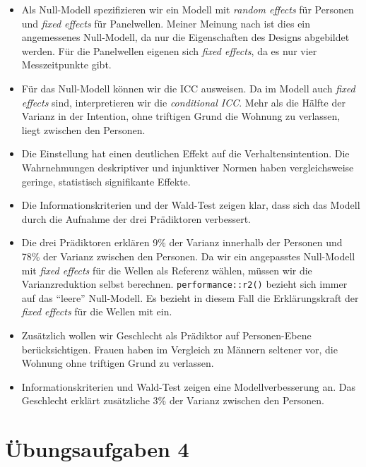 \documentclass[
]{book}
\begin{document}
\begin{itemize}
\item
  Als Null-Modell spezifizieren wir ein Modell mit \emph{random effects} für Personen und \emph{fixed effects} für Panelwellen. Meiner Meinung nach ist dies ein angemessenes Null-Modell, da nur die Eigenschaften des Designs abgebildet werden. Für die Panelwellen eigenen sich \emph{fixed effects}, da es nur vier Messzeitpunkte gibt.
\item
  Für das Null-Modell können wir die ICC ausweisen. Da im Modell auch \emph{fixed effects} sind, interpretieren wir die \emph{conditional ICC}. Mehr als die Hälfte der Varianz in der Intention, ohne triftigen Grund die Wohnung zu verlassen, liegt zwischen den Personen.
\item
  Die Einstellung hat einen deutlichen Effekt auf die Verhaltensintention. Die Wahrnehmungen deskriptiver und injunktiver Normen haben vergleichsweise geringe, statistisch signifikante Effekte.
\item
  Die Informationskriterien und der Wald-Test zeigen klar, dass sich das Modell durch die Aufnahme der drei Prädiktoren verbessert.
\item
  Die drei Prädiktoren erklären 9\% der Varianz innerhalb der Personen und 78\% der Varianz zwischen den Personen. Da wir ein angepasstes Null-Modell mit \emph{fixed effects} für die Wellen als Referenz wählen, müssen wir die Varianzreduktion selbst berechnen. \texttt{performance::r2()} bezieht sich immer auf das ``leere'' Null-Modell. Es bezieht in diesem Fall die Erklärungskraft der \emph{fixed effects} für die Wellen mit ein.
\item
  Zusätzlich wollen wir Geschlecht als Prädiktor auf Personen-Ebene berücksichtigen. Frauen haben im Vergleich zu Männern seltener vor, die Wohnung ohne triftigen Grund zu verlassen.
\item
  Informationskriterien und Wald-Test zeigen eine Modellverbesserung an. Das Geschlecht erklärt zusätzliche 3\% der Varianz zwischen den Personen.
\end{itemize}

\hypertarget{uxfcbungsaufgaben-4}{%
\section{Übungsaufgaben 4}\label{uxfcbungsaufgaben-4}}
\end{document}
